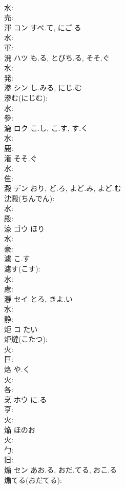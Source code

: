\documentclass[8pt]{extreport}
\begin{document}
\begin{CJK}{UTF8}{min}
\\	水: 
\\	売: 
\\	渾	コン	すべ.て, にご.る		
\\	水: 
\\	軍: 
\\	溌	ハツ	も.る, とびち.る, そそ.ぐ		
\\	水: 
\\	発: 
\\	滲	シン	し.みる, にじ.む		
\\	滲む(にじむ): 
\\	水: 
\\	參: 
\\	漉	ロク	こ.し, こ.す, す.く		
\\	水: 
\\	鹿: 
\\	潅		そそ.ぐ			
\\	水: 
\\	隹: 
\\	澱	デン	おり, ど.ろ, よど.み, よど.む		
\\	沈澱(ちんでん): 
\\	水: 
\\	殿: 
\\	濠	ゴウ	ほり		
\\	水: 
\\	豪: 
\\	濾		こ.す			
\\	濾す(こす): 
\\	水: 
\\	慮: 
\\	瀞	セイ	とろ, きよ.い		
\\	水: 
\\	静: 
\\	炬	コ		たい	
\\	炬燵(こたつ): 
\\	火: 
\\	巨: 
\\	烙		や.く			
\\	火: 
\\	各: 
\\	烹	ホウ	に.る		
\\	亨: 
\\	火: 
\\	焔		ほのお			
\\	火: 
\\	勹: 
\\	旧: 
\\	煽	セン	あお.る, おだ.てる, おこ.る		
\\	煽てる(おだてる): 

\end{CJK}
\end{document}
